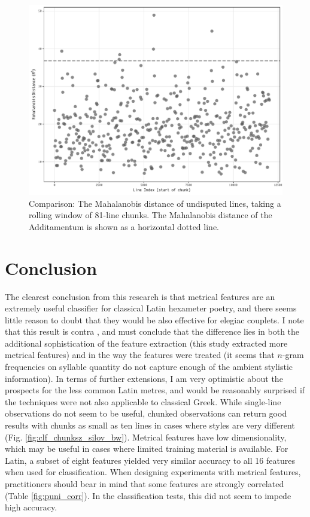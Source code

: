 \documentclass[11pt,a4paper]{scrartcl} %
\begin{document}
{\begin{figure}[h]
    \caption{Comparison: The Mahalanobis distance of undisputed lines, taking a rolling window of 81-line chunks. The Mahalanobis distance of the Additamentum is shown as a horizontal dotted line.}
    \label{fig:rolling_weirdness}
    \includegraphics[width=\textwidth]{rolling_weirdness_bw.pdf}
\end{figure}

\section{Conclusion}
The clearest conclusion from this research is that metrical features are an extremely useful classifier for classical Latin hexameter poetry, and there seems little reason to doubt that they would be also effective for elegiac couplets. I note that this result is contra , and must conclude that the difference lies in both the additional sophistication of the feature extraction (this study extracted more metrical features) and in the way the features were treated (it seems that $n$-gram frequencies on syllable quantity do not capture enough of the ambient stylistic information). In terms of further extensions, I am very optimistic about the prospects for the less common Latin metres, and would be reasonably surprised if the techniques were not also applicable to classical Greek. While single-line observations do not seem to be useful, chunked observations can return good results with chunks as small as ten lines in cases where styles are very different (Fig. \ref{fig:clf_chunksz_silov_bw}). Metrical features have low dimensionality, which may be useful in cases where limited training material is available. For Latin, a subset of eight features yielded very similar accuracy to all 16 features when used for classification. When designing experiments with metrical features, practitioners should bear in mind that some features are strongly correlated (Table \ref{fig:puni_corr}). In the classification tests, this did not seem to impede high accuracy.

}
\end{document}
